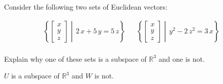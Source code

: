 
\begin{exerciseStatement}


Consider the following two sets of Euclidean vectors: 


\begin{align*}  \left\{ \left[\begin{array}{c}
x \\
y \\
z
\end{array}\right] \middle|\,2 \, x + 5 \, y = 5 \, z\right\}  & &   \left\{ \left[\begin{array}{c}
x \\
y \\
z
\end{array}\right] \middle|\,y^{2} - 2 \, z^{2} = 3 \, x\right\}  \\ \end{align*}
            

 Explain why one of these sets is a subspace of \(\mathbb{R}^ 3 \) and one is not. 


\end{exerciseStatement}
    
\begin{exerciseAnswer} 


\(U\) is a subspace of \(\mathbb{R}^ 3 \) and \(W\) is not.


\end{exerciseAnswer}
    
